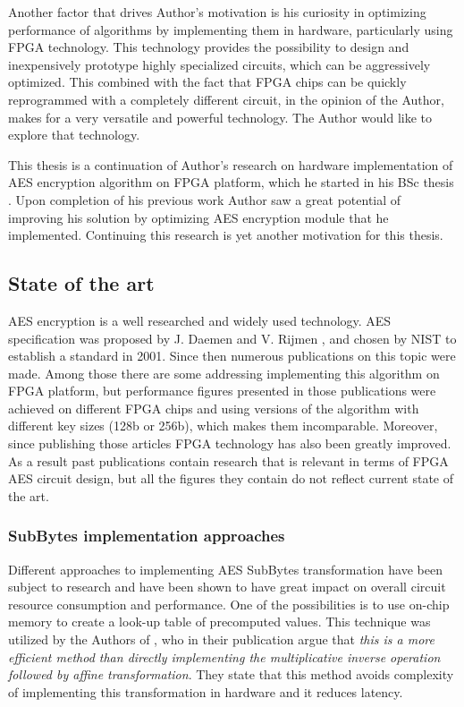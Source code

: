 Another factor that drives Author's motivation is his curiosity in optimizing performance of algorithms by implementing them in hardware, particularly using FPGA technology. This technology provides the possibility to design and inexpensively prototype highly specialized circuits, which can be aggressively optimized. This combined with the fact that FPGA chips can be quickly reprogrammed with a completely different circuit, in the opinion of the Author, makes for a very versatile and powerful technology. The Author would like to explore that technology.

This thesis is a continuation of Author's research on hardware implementation of AES encryption algorithm on FPGA platform, which he started in his BSc thesis \cite{inzynierka}. Upon completion of his previous work Author saw a great potential of improving his solution by optimizing AES encryption module that he implemented. Continuing this research is yet another motivation for this thesis.

\subsection{State of the art}
\label{sec:state-of-the-art} 
AES encryption is a well researched and widely used technology. AES specification was proposed by J. Daemen and V. Rijmen \cite{daemen1999aes}, and chosen by NIST to establish a standard \cite{aes-standard, elbirt2001fpga} in 2001. Since then numerous publications on this topic were made. Among those there are some addressing implementing this algorithm on FPGA platform, but performance figures presented in those publications were achieved on different FPGA chips and using versions of the algorithm with different key sizes (128b or 256b), which makes them incomparable. Moreover, since publishing those articles FPGA technology has also been greatly improved. As a result past publications contain research that is relevant in terms of FPGA AES circuit design, but all the figures they contain do not reflect current state of the art.

\subsubsection{SubBytes implementation approaches}
Different approaches to implementing AES SubBytes transformation have been subject to research and have been shown to have great impact on overall circuit resource consumption and performance. One of the possibilities is to use on-chip memory to create a look-up table of precomputed values. This technique was utilized by the Authors of \cite{hoang2012efficient}, who in their publication argue that \textit{this is a more efficient method than directly implementing the multiplicative inverse operation followed by affine transformation}. They state that this method avoids complexity of implementing this transformation in hardware and it reduces latency. 

